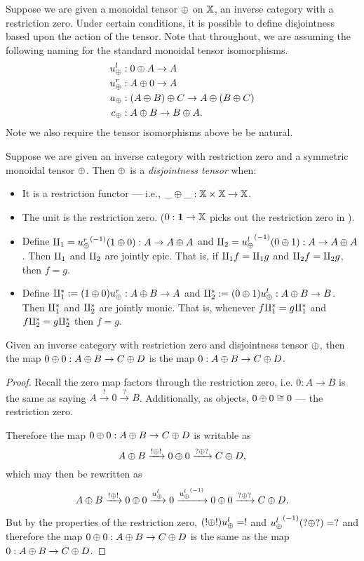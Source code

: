 Suppose we are given a monoidal tensor $\oplus$ on $\mathbb{X}$, an inverse category with a restriction zero.
Under certain conditions, it is possible to define disjointness based upon the action of the
tensor. Note that throughout, we are assuming the following naming for the standard monoidal tensor
isomorphisms.
\begin{align*}
   u_{\oplus}^l &: 0 \oplus A \to A\\
   u_{\oplus}^r &: A \oplus 0 \to A\\
   a_\oplus &: (A \oplus B) \oplus C \to A \oplus (B \oplus C) \\
   c_\oplus &: A \oplus B \to B \oplus A.
 \end{align*}
Note we also require the tensor isomorphisms above be be natural.

\begin{definition}\label{def:disjointness_tensor}
  Suppose we are given an inverse category \X with restriction zero and a symmetric monoidal tensor
  $\oplus$. Then $\oplus$ is a \emph{disjointness tensor} when:
  \begin{itemize}
    \item It is a restriction functor --- i.e., $\_ \oplus \_ : \mathbb{X} \times \mathbb{X} \to \mathbb{X}$.
    \item The unit is the restriction zero. ($0 : \boldsymbol{1}\to \mathbb{X}$ picks out the restriction
    zero in \X).
    \item Define $\amalg_{1} = {u_{\oplus}^r}^{(-1)}(1\oplus0):A\to A\oplus A$ and $\amalg_{2} = {u_{\oplus}^l}^{(-1)}(0\oplus1): A\to A\oplus A$. Then
      $\amalg_{1}$ and $\amalg_{2}$ are jointly epic. That is, if $\amalg_{1} f = \amalg_{1} g$ and $\amalg_{2} f = \amalg_{2} g$, then
      $f = g$.
    \item Define $\amalg_{1}^{*} := (1\oplus0)u_{\oplus}^r: A\oplus B \to A$ and $\amalg_{2}^{*} := (0\oplus1)u_{\oplus}^l:A\oplus B \to B$. Then
      $\amalg_{1}^{*}$  and $\amalg_{2}^{*}$ are jointly monic. That is, whenever $f\amalg_{1}^{*} = g \amalg_{1}^{*}$ and
      $f\amalg_{2}^{*} = g\amalg_{2}^{*}$ then $f = g$.
  \end{itemize}

\end{definition}

\begin{lemma}\label{lem:zero_plus_zero_is_zero}
  Given an inverse category \X with restriction zero and disjointness tensor $\oplus$, then the map
  $0\oplus0: A\oplus B \to C\oplus D$ is the map $0: A\oplus B \to C\oplus D$.
\end{lemma}
\begin{proof}
  Recall the zero map factors through the restriction zero, i.e. $0:A \to B$ is the same as
  saying $A\xrightarrow{!} 0 \xrightarrow{?}B$. Additionally, as objects, $0\oplus0 \cong 0$ ---
  the restriction zero.

  Therefore the map $0\oplus0: A\oplus B \to C\oplus D$ is writable as
  \[
    A\oplus B \xrightarrow{!\oplus!}0\oplus0  \xrightarrow{?\oplus?} C\oplus D,
  \]
  which may then be rewritten as
  \[
    A\oplus B \xrightarrow{!\oplus!}0\oplus0 \xrightarrow{u_{\oplus}^l} 0
      \xrightarrow{{u_{\oplus}^l}^{(-1)}} 0\oplus0 \xrightarrow{?\oplus?} C\oplus D.
  \]

  But by the properties of the restriction zero, $(!\oplus!) u_{\oplus}^l = !$ and ${u_{\oplus}^l}^{(-1)}(?\oplus?) = ?$
  and therefore the map $0\oplus0: A\oplus B \to C\oplus D$ is the same as the map $0: A\oplus B \to C\oplus D$.
\end{proof}


